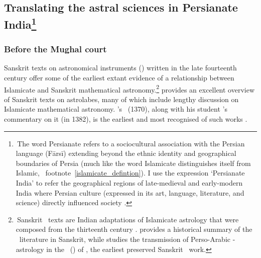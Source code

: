 \subsection[Translating the astral sciences in Persianate India]{Translating the astral sciences in Persianate India\footnote{\,The word Persianate refers to a sociocultural association with the Persian language (Fārsī) extending beyond the ethnic identity and geographical boundaries of Persia (much like the word Islamicate distinguishes itself from Islamic, \vid\ footnote~\ref{islamicate_defintion}). I use the expression `Persianate India' to refer the geographical regions of late-medieval and early-modern India where Persian culture (expressed in its art, language, literature, and science) directly influenced society \parencite[\vid][]{Eaton2019}.}}\label{translating_the_astral_sciences_in_persianate_india}

\subsubsection{Before the Mughal court} \label{pre_Mughal_court}
Sanskrit texts on astronomical instruments (\yantra) written in the late fourteenth century offer some of the earliest extant evidence of a relationship between Islamicate and Sanskrit mathematical astronomy.\footnote{\,Sanskrit \tajika\ texts are Indian adaptations of Islamicate astrology that were composed from the thirteenth century \ce. \textcite{PingreeAstralOmens} provides a historical summary of the \tajika\ literature in Sanskrit, while \textcite{Gansten} studies the transmission of Perso-Arabic \tazig-astrology in the \Karmaprakasa\ () of \Samarasimha, the earliest preserved Sanskrit \tajika\ work.\label{tajika_footnote}} \textcite{SarmaAstrolabeinSanskrit} provides an excellent overview of Sanskrit texts on astrolabes, many of which include lengthy discussion on Islamicate mathematical astronomy. \MahendraSuri's \Yantraraja\ (1370), along with his student \MalayenduSuri's commentary on it (in 1382), is the earliest and most recognised of such works \parencite{PlofkerAstrolabe}. 

